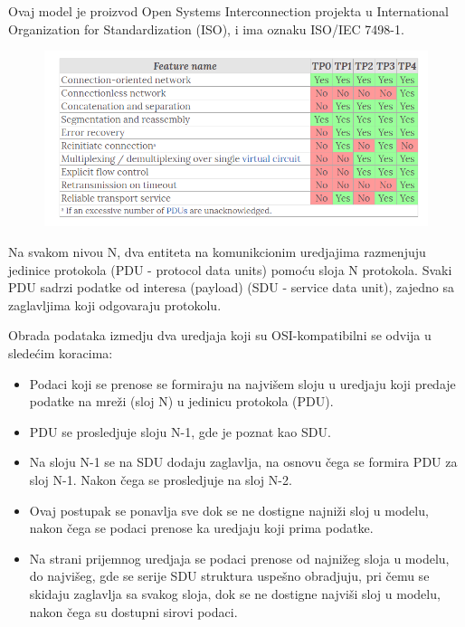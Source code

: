 \documentclass[a4paper,12pt, master]{etf}
\begin{document}
	Ovaj model je proizvod Open Systems Interconnection projekta u
	International Organization for Standardization (ISO), i ima oznaku ISO/IEC
	7498-1.

	\begin{figure}[htb]
			\centering
			\includegraphics[scale=.43]{../pic/tp_classes.png}
			\label{fig:tp_classes}
	\end{figure}

	Na svakom nivou N, dva entiteta na komunikcionim uredjajima razmenjuju
	jedinice protokola (PDU - protocol data units) pomo\'{c}u sloja N
	protokola. Svaki PDU sadrzi podatke od interesa	(payload) (SDU - service
	data unit), zajedno sa zaglavljima koji odgovaraju protokolu.

	Obrada podataka izmedju dva uredjaja koji su OSI-kompatibilni se odvija u
	slede\'{c}im koracima:

	\begin{itemize}
		\item Podaci koji se prenose se formiraju na najvi\v{s}em sloju u
		uredjaju koji predaje podatke na mre\v{z}i (sloj N) u jedinicu
		protokola (PDU).
		\item PDU se prosledjuje sloju N-1, gde je poznat kao SDU.
		\item Na sloju N-1 se na SDU dodaju zaglavlja, na osnovu \v{c}ega se
		formira PDU za sloj N-1. Nakon \v{c}ega se prosledjuje na sloj N-2.
		\item Ovaj postupak se ponavlja sve dok se ne dostigne najni\v{z}i sloj
		u modelu, nakon	\v{c}ega se podaci prenose ka uredjaju koji prima
		podatke.
		\item Na strani prijemnog uredjaja se podaci prenose od najni\v{z}eg
		sloja u modelu, do najvi\v{s}eg, gde se serije SDU struktura
		uspe\v{s}no obradjuju, pri \v{c}emu se skidaju zaglavlja sa svakog
		sloja, dok se ne dostigne najvi\v{s}i sloj u modelu, nakon \v{c}ega su
		dostupni sirovi podaci.
	\end{itemize}
\end{document}
